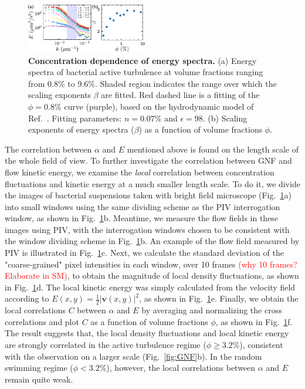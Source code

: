 \documentclass[twocolumn,aps,prl,amsmath,amssymb,longbibliography]{revtex4-2}
\begin{document}
\begin{figure}[!]
\begin{center}
\includegraphics[width=0.47\textwidth]{figures/energy-spectra/v1.pdf}
\caption[Concentration dependence of energy spectra]
{
\textbf{Concentration dependence of energy spectra.}
(a) Energy spectra of bacterial active turbulence at volume fractions ranging from 0.8\% to 9.6\%. Shaded region indicates the range over which the scaling exponents $\beta$ are fitted. Red dashed line is a fitting of the $\phi=0.8\%$ curve (purple), based on the hydrodynamic model of Ref.~\cite{Bardfalvy2019}. Fitting parameters: $n=0.07\%$ and $\epsilon=98$.
(b) Scaling exponents of energy spectra ($\beta$) as a function of volume fractions $\phi$.
}
\label{fig:energy-spectra}
\end{center}
\end{figure}

The correlation between $\alpha$ and $E$ mentioned above is found on the length scale of the whole field of view.
To further investigate the correlation between GNF and flow kinetic energy, we examine the \emph{local} correlation between concentration fluctuations and kinetic energy at a much smaller length scale.
To do it, we divide the images of bacterial suspensions taken with bright field microscope (Fig.~\ref{fig:energy-spectra}a) into small windows using the same dividing scheme as the PIV interrogation window, as shown in Fig.~\ref{fig:energy-spectra}b.
Meantime, we measure the flow fields in these images using PIV, with the interrogation windows chosen to be consistent with the window dividing scheme in Fig.~\ref{fig:energy-spectra}b.
An example of the flow field measured by PIV is illustrated in Fig.~\ref{fig:energy-spectra}c.
Next, we calculate the standard deviation of the "coarse-grained" pixel intensities in each window, over 10 frames \textcolor{red}{(why 10 frames? Elaborate in SM)}, to obtain the magnitude of local density fluctuations, as shown in Fig.~\ref{fig:energy-spectra}d.
The local kinetic energy was simply calculated from the velocity field according to $E(x, y) = \frac{1}{2}|\boldsymbol{v}(x, y)|^2$, as shown in Fig.~\ref{fig:energy-spectra}e.
Finally, we obtain the local correlations $C$ between $\alpha$ and $E$ by averaging and normalizing the cross correlations and plot $C$ as a function of volume fractions $\phi$, as shown in Fig.~\ref{fig:energy-spectra}f. The result suggests that, the local density fluctuations and local kinetic energy are strongly correlated in the active turbulence regime ($\phi\ge3.2\%$), consistent with the observation on a larger scale (Fig.~\ref{fig:GNF}b).
In the random swimming regime ($\phi<3.2\%$), however, the local correlations between $\alpha$ and $E$ remain quite weak.
\end{document}
